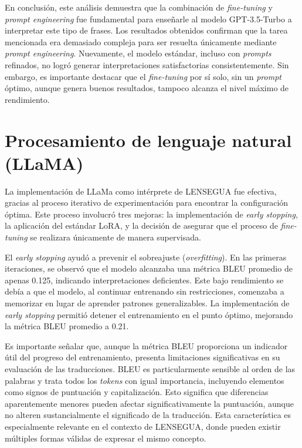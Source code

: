 En conclusión, este análisis demuestra que la combinación de \textit{fine-tuning} y \textit{prompt engineering} fue fundamental para enseñarle al modelo GPT-3.5-Turbo a interpretar este tipo de frases. Los resultados obtenidos confirman que la tarea mencionada era demasiado compleja para ser resuelta únicamente mediante \textit{prompt engineering}. Nuevamente, el modelo estándar, incluso con \textit{prompts} refinados, no logró generar interpretaciones satisfactorias consistentemente. Sin embargo, es importante destacar que el \textit{fine-tuning} por sí solo, sin un \textit{prompt} óptimo, aunque genera buenos resultados, tampoco alcanza el nivel máximo de rendimiento.





\section{Procesamiento de lenguaje natural (LLaMA)} 

La implementación de LLaMa como intérprete de LENSEGUA fue efectiva, gracias al proceso iterativo de experimentación para encontrar la configuración óptima. Este proceso involucró tres mejoras: la implementación de \textit{early stopping}, la aplicación del estándar LoRA, y la decisión de asegurar que el proceso de \textit{fine-tuning} se realizara únicamente de manera supervisada.

El \textit{early stopping} ayudó a prevenir el sobreajuste (\textit{overfitting}). En las primeras iteraciones, se observó que el modelo alcanzaba una métrica BLEU promedio de apenas 0.125, indicando interpretaciones deficientes. Este bajo rendimiento se debía a que el modelo, al continuar entrenando sin restricciones, comenzaba a memorizar en lugar de aprender patrones generalizables. La implementación de \textit{early stopping} permitió detener el entrenamiento en el punto óptimo, mejorando la métrica BLEU promedio a 0.21.

Es importante señalar que, aunque la métrica BLEU proporciona un indicador útil del progreso del entrenamiento, presenta limitaciones significativas en su evaluación de las traducciones. BLEU es particularmente sensible al orden de las palabras y trata todos los \textit{tokens} con igual importancia, incluyendo elementos como signos de puntuación y capitalización. Esto significa que diferencias aparentemente menores pueden afectar significativamente la puntuación, aunque no alteren sustancialmente el significado de la traducción. Esta característica es especialmente relevante en el contexto de LENSEGUA, donde pueden existir múltiples formas válidas de expresar el mismo concepto.


